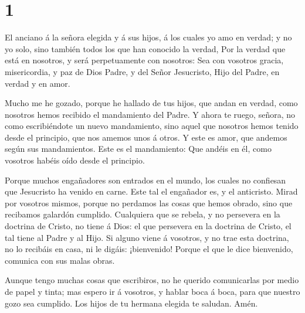 \hypertarget{section}{%
\section{1}\label{section}}

 El anciano á la señora elegida y á sus hijos, á los cuales
yo amo en verdad; y no yo solo, sino también todos los que han conocido
la verdad,  Por la verdad que está en nosotros, y será
perpetuamente con nosotros:  Sea con vosotros gracia,
misericordia, y paz de Dios Padre, y del Señor Jesucristo, Hijo del
Padre, en verdad y en amor.

 Mucho me he gozado, porque he hallado de tus hijos, que
andan en verdad, como nosotros hemos recibido el mandamiento del Padre.
 Y ahora te ruego, señora, no como escribiéndote un nuevo
mandamiento, sino aquel que nosotros hemos tenido desde el principio,
que nos amemos unos á otros.  Y este es amor, que andemos
según sus mandamientos. Este es el mandamiento: Que andéis en él, como
vosotros habéis oído desde el principio.

 Porque muchos engañadores son entrados en el mundo, los
cuales no confiesan que Jesucristo ha venido en carne. Este tal el
engañador es, y el anticristo.  Mirad por vosotros mismos,
porque no perdamos las cosas que hemos obrado, sino que recibamos
galardón cumplido.  Cualquiera que se rebela, y no persevera
en la doctrina de Cristo, no tiene á Dios: el que persevera en la
doctrina de Cristo, el tal tiene al Padre y al Hijo.  Si
alguno viene á vosotros, y no trae esta doctrina, no lo recibáis en
casa, ni le digáis: ¡bienvenido!  Porque el que le dice
bienvenido, comunica con sus malas obras.

 Aunque tengo muchas cosas que escribiros, no he querido
comunicarlas por medio de papel y tinta; mas espero ir á vosotros, y
hablar boca á boca, para que nuestro gozo sea cumplido. 
Los hijos de tu hermana elegida te saludan. Amén.

